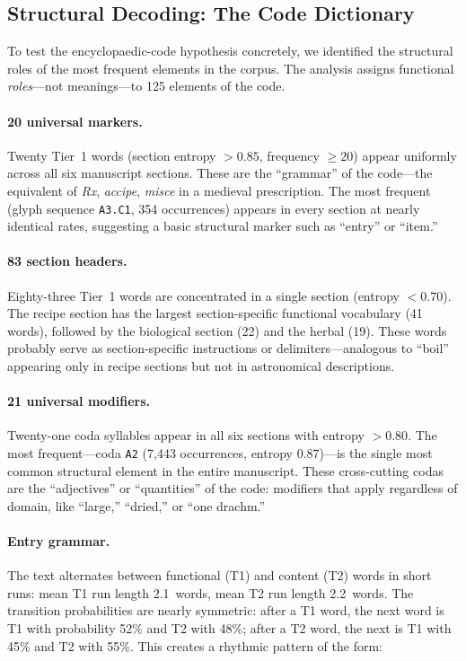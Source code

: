 \subsection{Structural Decoding: The Code Dictionary}

To test the encyclopaedic-code hypothesis concretely, we identified the structural roles of the most frequent elements in the corpus.  The analysis assigns functional \emph{roles}---not meanings---to 125 elements of the code.

\paragraph{20 universal markers.}
Twenty Tier~1 words (section entropy $> 0.85$, frequency $\geq 20$) appear uniformly across all six manuscript sections.  These are the ``grammar'' of the code---the equivalent of \emph{Rx}, \emph{accipe}, \emph{misce} in a medieval prescription.  The most frequent (glyph sequence \texttt{A3.C1}, 354 occurrences) appears in every section at nearly identical rates, suggesting a basic structural marker such as ``entry'' or ``item.''

\paragraph{83 section headers.}
Eighty-three Tier~1 words are concentrated in a single section (entropy $< 0.70$).  The recipe section has the largest section-specific functional vocabulary (41 words), followed by the biological section (22) and the herbal (19).  These words probably serve as section-specific instructions or delimiters---analogous to ``boil'' appearing only in recipe sections but not in astronomical descriptions.

\paragraph{21 universal modifiers.}
Twenty-one coda syllables appear in all six sections with entropy $> 0.80$.  The most frequent---coda \texttt{A2} (7,443 occurrences, entropy 0.87)---is the single most common structural element in the entire manuscript.  These cross-cutting codas are the ``adjectives'' or ``quantities'' of the code: modifiers that apply regardless of domain, like ``large,'' ``dried,'' or ``one drachm.''

\paragraph{Entry grammar.}
The text alternates between functional (T1) and content (T2) words in short runs: mean T1 run length 2.1~words, mean T2 run length 2.2~words.  The transition probabilities are nearly symmetric: after a T1 word, the next word is T1 with probability 52\% and T2 with 48\%; after a T2 word, the next is T1 with 45\% and T2 with 55\%.  This creates a rhythmic pattern of the form:

